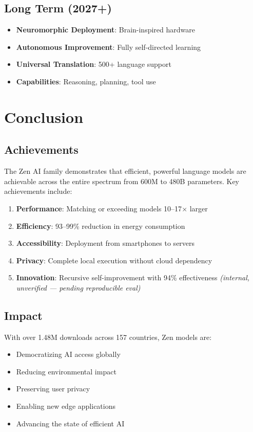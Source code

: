 \documentclass[11pt,a4paper]{article}
\begin{document}
\subsection{Long Term (2027+)}
\begin{itemize}
    \item \textbf{Neuromorphic Deployment}: Brain-inspired hardware
    \item \textbf{Autonomous Improvement}: Fully self-directed learning
    \item \textbf{Universal Translation}: 500+ language support
    \item \textbf{Capabilities}: Reasoning, planning, tool use
\end{itemize}

\section{Conclusion}

\subsection{Achievements}

The Zen AI family demonstrates that efficient, powerful language models are
achievable across the entire spectrum from 600M to 480B parameters. Key
achievements include:

\begin{enumerate}
    \item \textbf{Performance}: Matching or exceeding models 10--17$\times$ larger
    \item \textbf{Efficiency}: 93--99\% reduction in energy consumption
    \item \textbf{Accessibility}: Deployment from smartphones to servers
    \item \textbf{Privacy}: Complete local execution without cloud dependency
    \item \textbf{Innovation}: Recursive self-improvement with 94\% effectiveness \textit{(internal, unverified --- pending reproducible eval)}
\end{enumerate}

\subsection{Impact}

With over 1.48M downloads across 157 countries, Zen models are:
\begin{itemize}
    \item Democratizing AI access globally
    \item Reducing environmental impact
    \item Preserving user privacy
    \item Enabling new edge applications
    \item Advancing the state of efficient AI
\end{itemize}
\end{document}
